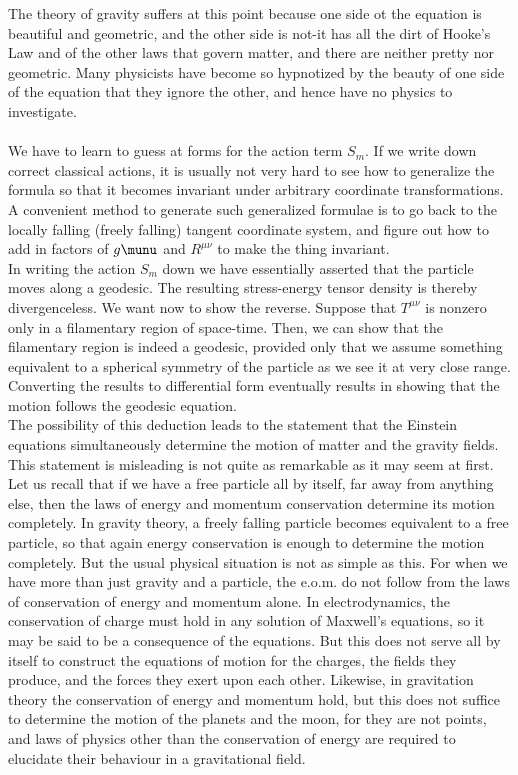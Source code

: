 The theory of gravity suffers at this point because one side ot the equation is beautiful and geometric, and the other side is not-it has all the dirt of Hooke's Law and of the other laws that govern matter, and there are neither pretty nor geometric. Many physicists have become so hypnotized by the beauty of one side of the equation that they ignore the other, and hence have no physics to investigate.
\\
\\ 
We have to learn to guess at forms for the action term $S_m$. If we write down correct classical actions, it is usually not very hard to see how to generalize the formula so that it becomes invariant under arbitrary coordinate transformations. A convenient method to generate such generalized formulae is to go back to the locally falling (freely falling) tangent coordinate system, and figure out how to add in factors of $g\munu$ and $R^{\mu \nu}$ to make the thing invariant.\\
In writing the action $S_m$ down we have essentially asserted that the particle moves along a geodesic. The resulting stress-energy tensor density is thereby divergenceless. We want now to show the reverse. Suppose that $T^{\mu \nu}$ is nonzero only in a filamentary region of space-time. Then, we can show that the filamentary region is indeed a geodesic, provided only that we assume something equivalent to a spherical symmetry of the particle as we see it at very close range. Converting the results to differential form eventually results in showing that the motion follows the geodesic equation.\\
The possibility of this deduction leads to the statement that the Einstein equations simultaneously determine the motion of matter and the gravity fields. This statement is misleading is not quite as remarkable as it may seem at first. Let us recall that if we have a free particle all by itself, far away from anything else, then the laws of energy and momentum conservation determine its motion completely. In gravity theory, a freely falling particle becomes equivalent to a free particle, so that again energy conservation is enough to determine the motion completely. But the usual physical situation is not as simple as this. For when we have more than just gravity and a particle, the e.o.m. do not follow from the laws of conservation of energy and momentum alone. In electrodynamics, the conservation of charge must hold in any solution of Maxwell's equations, so it may be said to be a consequence of the equations. But this does not serve all by itself to construct the equations of motion for the charges, the fields they produce, and the forces they exert upon each other. Likewise, in gravitation theory the conservation of energy and momentum hold, but this does not suffice to determine the motion of the planets and the moon, for they are not points, and laws of physics other than the conservation of energy are required to elucidate their behaviour in a gravitational field.





